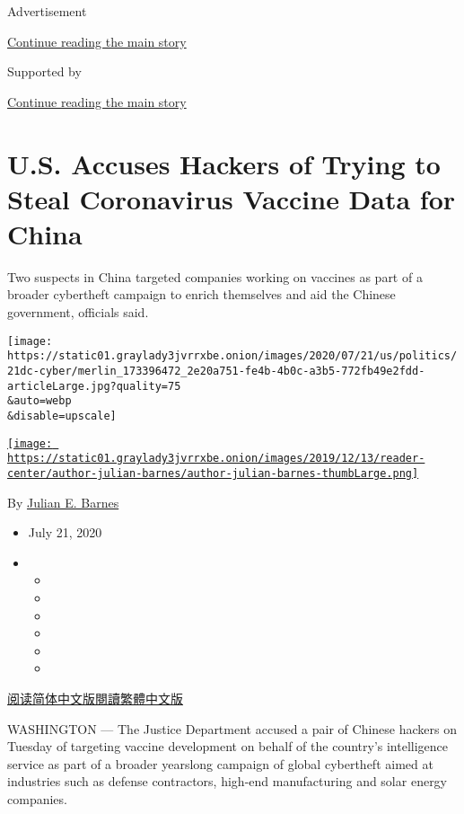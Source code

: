 Advertisement

\protect\hyperlink{after-top}{Continue reading the main story}

Supported by

\protect\hyperlink{after-sponsor}{Continue reading the main story}

\hypertarget{us-accuses-hackers-of-trying-to-steal-coronavirus-vaccine-data-for-china}{%
\section{U.S. Accuses Hackers of Trying to Steal Coronavirus Vaccine
Data for
China}\label{us-accuses-hackers-of-trying-to-steal-coronavirus-vaccine-data-for-china}}

Two suspects in China targeted companies working on vaccines as part of
a broader cybertheft campaign to enrich themselves and aid the Chinese
government, officials said.

\texttt{[image: https://static01.graylady3jvrrxbe.onion/images/2020/07/21/us/politics/21dc-cyber/merlin\_173396472\_2e20a751-fe4b-4b0c-a3b5-772fb49e2fdd-articleLarge.jpg?quality=75\\\&auto=webp\\\&disable=upscale]}

\href{https://www.nytimes3xbfgragh.onion/by/julian-e-barnes}{\texttt{[image: https://static01.graylady3jvrrxbe.onion/images/2019/12/13/reader-center/author-julian-barnes/author-julian-barnes-thumbLarge.png]}}

By \href{https://www.nytimes3xbfgragh.onion/by/julian-e-barnes}{Julian
E. Barnes}

\begin{itemize}
\item
  July 21, 2020
\item
  \begin{itemize}
  \item
  \item
  \item
  \item
  \item
  \item
  \end{itemize}
\end{itemize}

\href{https://cn.nytimes3xbfgragh.onion/usa/20200722/china-hacking-coronavirus-vaccine/}{阅读简体中文版}\href{https://cn.nytimes3xbfgragh.onion/usa/20200722/china-hacking-coronavirus-vaccine/zh-hant/}{閱讀繁體中文版}

WASHINGTON --- The Justice Department accused a pair of Chinese hackers
on Tuesday of targeting vaccine development on behalf of the country's
intelligence service as part of a broader yearslong campaign of global
cybertheft aimed at industries such as defense contractors, high-end
manufacturing and solar energy companies.

